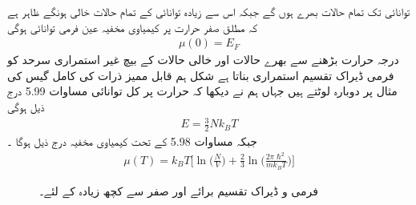 توانائی  تک تمام حالات بھرے ہوں گے جبکہ اس سے زیادہ توانائی کے تمام حالات خالی ہونگے ظاہر ہے کہ مطلق صفر حرارت پر کیمیاوی مخفیہ عین فرمی توانائی ہوگی 
\begin{align}
\mu (0) = E_F
\end{align}
درجہ حرارت بڑھنے سے بھرے حالات اور خالی حالات کے بیچ غیر استمراری سرحد کو فرمی ڈیراک تقسیم استمراری بناتا ہے شکل    ہم قابل ممیز ذرات کی کامل گیس کی مثال پر دوبارہ لوٹتے ہیں جہاں ہم نے دیکھا کہ حرارت  پر کل توانائی مساوات 5.99 درج ذیل ہوگی 
\begin{align}
E = \frac{3}{2} N k_B T
\end{align}
جبکہ مساوات 5.98 کے تحت کیمیاوی مخفیہ درج ذیل ہوگا ۔
\begin{align}
\mu (T) = k_B T \big [ \ln\big ( \frac{N}{V} \big ) + \frac{2}{3} \ln\big ( \frac{2 \pi \hslash^2}{m k_B T} \big ) \big ]
\end{align}

\begin{figure}
\centering
{}
\caption{فرمی و  ڈیراک تقسیم برائے  اور صفر سے کچھ  زیادہ  کے لئے۔}
\label{شکل_متماثل_فرمی_ڈیراک_تقسیم}
\end{figure}


